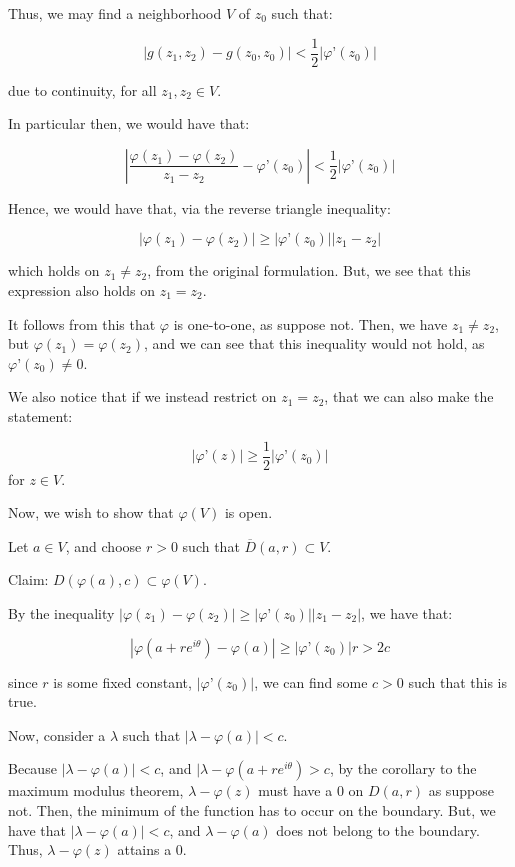 \documentclass[10pt]{article}
\begin{document}
Thus, we may find a neighborhood $V$ of $z_0$ such that:

$$|g(z_1,z_2) - g(z_0,z_0) | < \frac{1}{2}  | \varphi’(z_0) | $$

due to continuity, for all $z_1,z_2 \in V$.

In particular then, we would have that:

$$\left|\frac{\varphi(z_1) - \varphi(z_2)}{z_1- z_2}  - \varphi’(z_0) \right| < \frac{1}{2}  | \varphi’(z_0) | $$

Hence, we would have that, via the reverse triangle inequality:

$$| \varphi(z_1) - \varphi(z_2)| \geq | \varphi’(z_0)| | z_1 - z_2| $$

which holds on $z_1 \not = z_2$, from the original formulation. But, we see that this expression also holds on $z_1 = z_2$.

It follows from this that $\varphi$ is one-to-one, as suppose not. Then, we have $z_1 \not = z_2$, but $\varphi(z_1) = \varphi(z_2)$, and we can see that this inequality would not hold, as $\varphi’(z_0) \not = 0$.

We also notice that if we instead restrict on $z_1 = z_2$, that we can also make the statement:

$$| \varphi’(z) | \geq \frac{1}{2} | \varphi’(z_0) | $$ for $z \in V$.

Now, we wish to show that $\varphi(V)$ is open. 

Let $a \in V$, and choose $r > 0$ such that $\overline{D}(a,r) \subset V$.

Claim: $D(\varphi(a), c) \subset \varphi(V)$.

By the inequality $ | \varphi(z_1) - \varphi(z_2)| \geq | \varphi’(z_0)| | z_1 - z_2| $, we have that:

$$ | \varphi(a + re^{i\theta}) - \varphi(a)| \geq | \varphi’(z_0)| r > 2c $$

since $r$ is some fixed constant, $|\varphi’(z_0)|$, we can find some $c > 0$ such that this is true.

Now, consider a $\lambda$ such that $| \lambda - \varphi(a) | < c$.

Because $| \lambda - \varphi(a) | < c$, and $|\lambda - \varphi(a + r e^{i\theta}) > c$, by the corollary to the maximum modulus theorem, $\lambda - \varphi(z)$ must have a 0 on $D(a,r)$ as suppose not. Then, the minimum of the function has to occur on the boundary. But, we have that $| \lambda -\varphi(a) | < c$, and $\lambda - \varphi(a)$ does not belong to the boundary. Thus, $\lambda - \varphi(z)$ attains a 0. 
\end{document}
